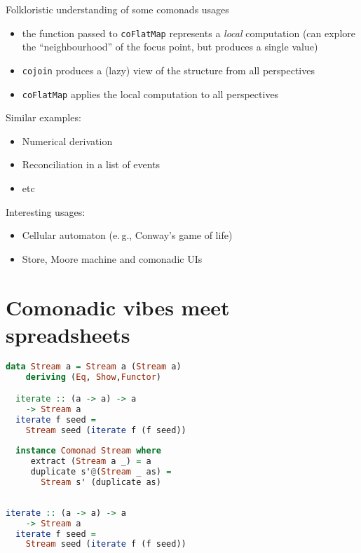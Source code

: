 \documentclass[10pt]{beamer}
\providecommand{\eg}{e.\,g.}
\begin{document}
\begin{frame}[fragile]
  \begin{alertblock}{Folkloristic understanding of some comonads usages}
    \begin{itemize}
  \item the function passed to \verb|coFlatMap| represents a \emph{local} computation (can explore the ``neighbourhood'' of the focus point, but produces a single value) 
  \item \verb|cojoin| produces a (lazy) view of the structure from all perspectives 
  \item \verb|coFlatMap| applies the local computation to all perspectives 
    \end{itemize}
  \end{alertblock}
\end{frame}
\begin{frame}[fragile]
  Similar examples:
  \begin{itemize}
    \item Numerical derivation
    \item Reconciliation in a list of events
    \item etc
  \end{itemize}
\end{frame}

\begin{frame}[fragile]
  Interesting usages:
  \begin{itemize}
    \item Cellular automaton (\eg, Conway’s game of life)
    \item Store, Moore machine and comonadic UIs
  \end{itemize}
\end{frame}

\section{Comonadic vibes meet spreadsheets}

\begin{frame}[fragile]
\begin{lstlisting}[language=haskell, basicstyle=\ttfamily]
  data Stream a = Stream a (Stream a)
    deriving (Eq, Show,Functor)

  iterate :: (a -> a) -> a 
    -> Stream a
  iterate f seed = 
    Stream seed (iterate f (f seed))  
  
  instance Comonad Stream where
     extract (Stream a _) = a
     duplicate s'@(Stream _ as) = 
       Stream s' (duplicate as)
  
\end{lstlisting}
\end{frame}
\begin{frame}[fragile]
\begin{lstlisting}[language=haskell, basicstyle=\ttfamily]
  iterate :: (a -> a) -> a 
    -> Stream a
  iterate f seed = 
    Stream seed (iterate f (f seed))  
\end{lstlisting}
\end{frame}
\end{document}
